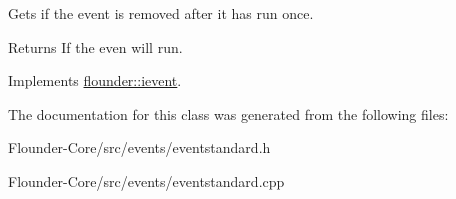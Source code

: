 Gets if the event is removed after it has run once. 

\begin{DoxyReturn}{Returns}
If the even will run. 
\end{DoxyReturn}


Implements \hyperlink{classflounder_1_1ievent_a7017c8803df2397758980cb61020e801}{flounder\+::ievent}.



The documentation for this class was generated from the following files\+:\begin{DoxyCompactItemize}
\item 
Flounder-\/\+Core/src/events/eventstandard.\+h\item 
Flounder-\/\+Core/src/events/eventstandard.\+cpp\end{DoxyCompactItemize}
